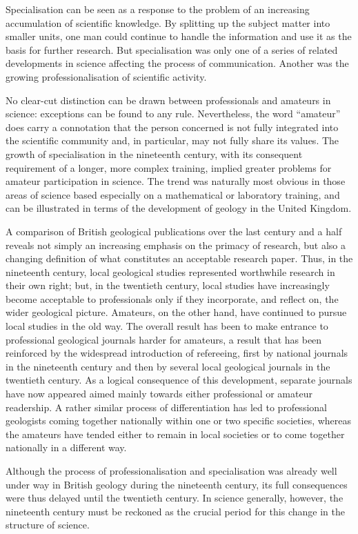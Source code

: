 \documentclass[UTF8,11pt]{ctexart}
\begin{document}
Specialisation can be seen as a response to the problem of an increasing accumulation of scientific knowledge. By splitting up the subject matter into smaller units, one man could continue to handle the information and use it as the basis for further research. But specialisation was only one of a series of related developments in science affecting the process of communication. Another was the growing professionalisation of scientific activity.


No clear-cut distinction can be drawn between professionals and amateurs in science: exceptions can be found to any rule. Nevertheless, the word “amateur” does carry a connotation that the person concerned is not fully integrated into the scientific community and, in particular, may not fully share its values. The growth of specialisation in the nineteenth century, with its consequent requirement of a longer, more complex training, implied greater problems for amateur participation in science. The trend was naturally most obvious in those areas of science based especially on a mathematical or laboratory training, and can be illustrated in terms of the development of geology in the United Kingdom.


A comparison of British geological publications over the last century and a half reveals not simply an increasing emphasis on the primacy of research, but also a changing definition of what constitutes an acceptable research paper. Thus, in the nineteenth century, local geological studies represented worthwhile research in their own right; but, in the twentieth century, local studies have increasingly become acceptable to professionals only if they incorporate, and reflect on, the wider geological picture. Amateurs, on the other hand, have continued to pursue local studies in the old way. The overall result has been to make entrance to professional geological journals harder for amateurs, a result that has been reinforced by the widespread introduction of refereeing, first by national journals in the nineteenth century and then by several local geological journals in the twentieth century. As a logical consequence of this development, separate journals have now appeared aimed mainly towards either professional or amateur readership. A rather similar process of differentiation has led to professional geologists coming together nationally within one or two specific societies, whereas the amateurs have tended either to remain in local societies or to come together nationally in a different way.


Although the process of professionalisation and specialisation was already well under way in British geology during the nineteenth century, its full consequences were thus delayed until the twentieth century. In science generally, however, the nineteenth century must be reckoned as the crucial period for this change in the structure of science.
\end{document}
